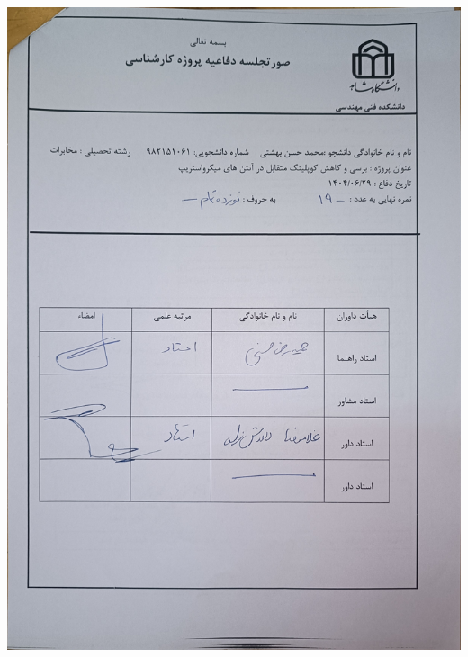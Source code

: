 \newpage
\thispagestyle{empty}
\centerline{\includegraphics[scale=0.2]{./Images/general/soorat.jpg}}